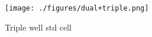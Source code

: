 
\begin{figure}[h]
	\label{fig_triplewellstdcell}
	\centering
	\texttt{[image: ./figures/dual+triple.png]}
	\caption{Triple well std cell}
\end{figure}
